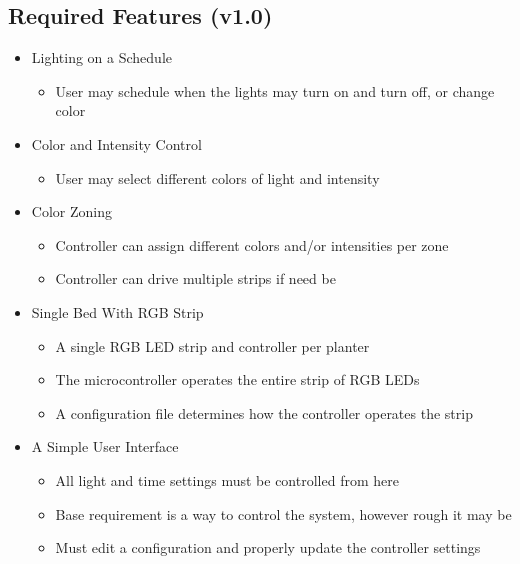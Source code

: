 \documentclass[letterpaper,10pt,draftclsnofoot,onecolumn]{article}
\begin{document}
	\subsection*{Required Features (v1.0)}
	\begin{itemize}

		\item Lighting on a Schedule
		\begin{itemize}
			\item User may schedule when the lights may turn on and turn off, or change color
			\end{itemize}

		\item Color and Intensity Control
		\begin{itemize}
			\item User may select different colors of light and intensity
		\end{itemize}

		\item Color Zoning
		\begin{itemize}
			\item Controller can assign different colors and/or intensities per zone
			\item Controller can drive multiple strips if need be
		\end{itemize}
		\newpage


		\item Single Bed With RGB Strip
		\begin{itemize}
			\item A single RGB LED strip and controller per planter
			\item The microcontroller operates the entire strip of RGB LEDs
			\item A configuration file determines how the controller operates the strip
		\end{itemize}

		\item A Simple User Interface
		\begin{itemize}
			\item All light and time settings must be controlled from here
			\item Base requirement is a way to control the system, however rough it may be
			\item Must edit a configuration and properly update the controller settings

		\end{itemize}
	\end{itemize}
\end{document}
